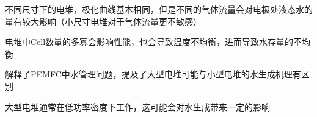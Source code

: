 \documentclass[utf8,a4paper,12pt] {ctexart}
\begin{document}
不同尺寸下的电堆，极化曲线基本相同，但是不同的气体流量会对电极处液态水的量有较大影响（小尺寸电堆对于气体流量更不敏感）\cite{bonnetDesign80kWePEM2008}

\par

电堆中Cell数量的多寡会影响性能，也会导致温度不均衡，进而导致水存量的不均衡\cite{millerReviewPolymerElectrolyte2011}

\par

解释了PEMFC中水管理问题，提及了大型电堆可能与小型电堆的水生成机理有区别\cite{jiReviewWaterManagement2009}

大型电堆通常在低功率密度下工作，这可能会对水生成带来一定的影响\cite{shojayianSimulationCathodeCatalyst2024}



\end{document}
